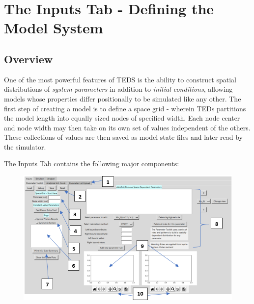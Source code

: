 \documentclass[11pt,letterpaper,titlepage]{article}
\begin{document}
	\newpage
	\section{The Inputs Tab - Defining the Model System}
		\subsection{Overview}
		    \par
		    One of the most powerful features of TEDS is the ability to construct spatial distributions of \textit{system parameters} in addition to \textit{initial conditions}, allowing models whose properties differ positionally to be simulated like any other. The first step of creating a model is to define a space grid - wherein TEDs partitions the model length into equally sized nodes of specified width. Each node center and node width may then take on its own set of values independent of the others. These collections of values are then saved as model state files and later read by the simulator.
			\par
			The Inputs Tab contains the following major components:
			
			\begin{figure}[H]
				\label{fig:labeled_main_interface}
				\centering
				\includegraphics[scale=1]{"labeled_main_interface"}
			\end{figure}
		
\end{document}
